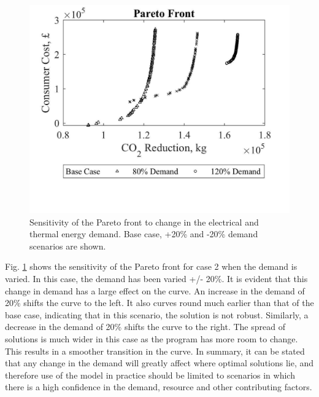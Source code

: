 \begin{figure}[H]
	\centering
    \includegraphics[width=\columnwidth]{Figures/ParetoSens2.jpg}
    \caption{Sensitivity of the Pareto front to change in the electrical and thermal energy demand. Base case, +20\% and -20\% demand scenarios are shown.}
    \label{fig:ParetoSens2}
\end{figure}

Fig. \ref{fig:ParetoSens2} shows the sensitivity of the Pareto front for case 2 when the demand is varied. In this case, the demand has been varied +/- 20\%. It is evident that this change in demand has a large effect on the curve. An increase in the demand of 20\% shifts the curve to the left. It also curves round much earlier than that of the base case, indicating that in this scenario, the solution is not robust. Similarly, a decrease in the demand of 20\% shifts the curve to the right. The spread of solutions is much wider in this case as the program has more room to change. This results in a smoother transition in the curve. In summary, it can be stated that any change in the demand will greatly affect where optimal solutions lie, and therefore use of the model in practice should be limited to scenarios in which there is a high confidence in the demand, resource and other contributing factors.

